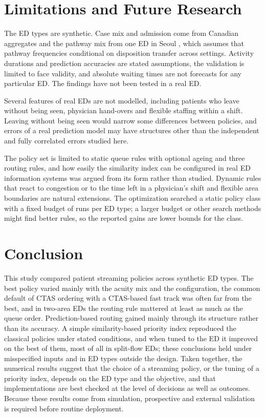 \section{Limitations and Future Research}
\label{sec:limitations}

The ED types are synthetic. Case mix and admission come from Canadian aggregates and the pathway mix from one ED in Seoul \cite{Rismanchian2023_PatientJourney}, which assumes that pathway frequencies conditional on disposition transfer across settings. Activity durations and prediction accuracies are stated assumptions, the validation is limited to face validity, and absolute waiting times are not forecasts for any particular ED. The findings have not been tested in a real ED.

Several features of real EDs are not modelled, including patients who leave without being seen, physician hand-overs and flexible staffing within a shift. Leaving without being seen would narrow some differences between policies, and errors of a real prediction model may have structures other than the independent and fully correlated errors studied here.

The policy set is limited to static queue rules with optional ageing and three routing rules, and how easily the similarity index can be configured in real ED information systems was argued from its form rather than studied. Dynamic rules that react to congestion or to the time left in a physician's shift \cite{Shakeri2025_WhoToSeeNext} and flexible area boundaries \cite{laker2014flex_track} are natural extensions. The optimization searched a static policy class with a fixed budget of runs per ED type; a larger budget or other search methods might find better rules, so the reported gains are lower bounds for the class.

\section{Conclusion}
\label{sec:conclusion}

This study compared patient streaming policies across \NEdTypes{} synthetic ED types. The best policy varied mainly with the acuity mix and the configuration, the common default of CTAS ordering with a CTAS-based fast track was often far from the best, and in two-area EDs the routing rule mattered at least as much as the queue order. Prediction-based routing gained mainly through its structure rather than its accuracy. A simple similarity-based priority index reproduced the classical policies under stated conditions, and when tuned to the ED it improved on the best of them, most of all in split-flow EDs; these conclusions held under misspecified inputs and in ED types outside the design. Taken together, the numerical results suggest that the choice of a streaming policy, or the tuning of a priority index, depends on the ED type and the objective, and that implementations are best checked at the level of decisions as well as outcomes. Because these results come from simulation, prospective and external validation is required before routine deployment.

